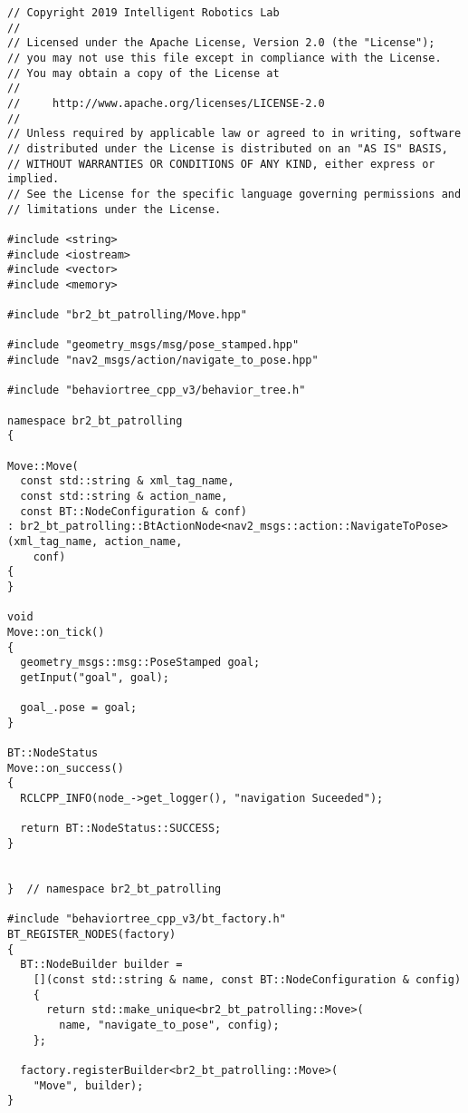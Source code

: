   \normalsize

 \footnotesize
\begin{tcolorbox}[sharp corners, colframe=gray!80, colback=LightGray, left=0pt, top=0pt, bottom=0pt, title=\texttt{br2\_bt\_patrolling/src/br2\_bt\_patrolling/Move.cpp}]
  \begin{verbatim}
// Copyright 2019 Intelligent Robotics Lab
//
// Licensed under the Apache License, Version 2.0 (the "License");
// you may not use this file except in compliance with the License.
// You may obtain a copy of the License at
//
//     http://www.apache.org/licenses/LICENSE-2.0
//
// Unless required by applicable law or agreed to in writing, software
// distributed under the License is distributed on an "AS IS" BASIS,
// WITHOUT WARRANTIES OR CONDITIONS OF ANY KIND, either express or implied.
// See the License for the specific language governing permissions and
// limitations under the License.

#include <string>
#include <iostream>
#include <vector>
#include <memory>

#include "br2_bt_patrolling/Move.hpp"

#include "geometry_msgs/msg/pose_stamped.hpp"
#include "nav2_msgs/action/navigate_to_pose.hpp"

#include "behaviortree_cpp_v3/behavior_tree.h"

namespace br2_bt_patrolling
{

Move::Move(
  const std::string & xml_tag_name,
  const std::string & action_name,
  const BT::NodeConfiguration & conf)
: br2_bt_patrolling::BtActionNode<nav2_msgs::action::NavigateToPose>(xml_tag_name, action_name,
    conf)
{
}

void
Move::on_tick()
{
  geometry_msgs::msg::PoseStamped goal;
  getInput("goal", goal);

  goal_.pose = goal;
}

BT::NodeStatus
Move::on_success()
{
  RCLCPP_INFO(node_->get_logger(), "navigation Suceeded");

  return BT::NodeStatus::SUCCESS;
}


}  // namespace br2_bt_patrolling

#include "behaviortree_cpp_v3/bt_factory.h"
BT_REGISTER_NODES(factory)
{
  BT::NodeBuilder builder =
    [](const std::string & name, const BT::NodeConfiguration & config)
    {
      return std::make_unique<br2_bt_patrolling::Move>(
        name, "navigate_to_pose", config);
    };

  factory.registerBuilder<br2_bt_patrolling::Move>(
    "Move", builder);
}
    \end{verbatim}
    \end{tcolorbox}
  \normalsize

